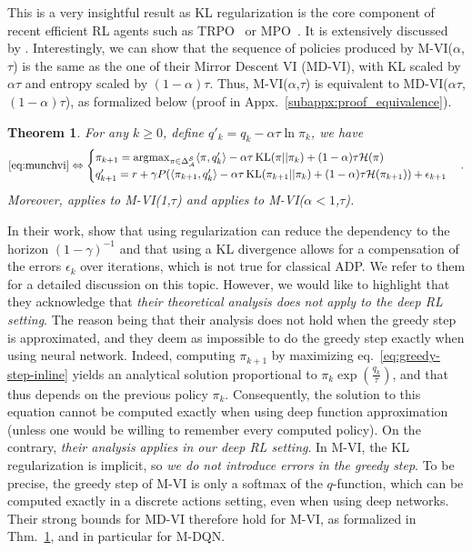 \documentclass{article}
\newtheorem{theorem}{Theorem}
\newcommand{\h}{\mathcal{H}}
\DeclareMathOperator*{\argmax}{argmax}
\DeclareMathOperator{\kl}{KL}
\newcommand{\states}{\mathcal{S}}
\newcommand{\actions}{\mathcal{A}}
\begin{document}
This is a very insightful result as KL regularization is the core component of recent efficient RL agents such as TRPO~\cite{schulman2015trust} or MPO~\cite{abdolmaleki2018maximum}. It is extensively discussed by \citet{vieillard2020leverage}. Interestingly, we can show that the sequence of policies produced by M-VI($\alpha$,$\tau$) is the same as the one of their Mirror Descent VI (MD-VI), with KL scaled by $\alpha\tau$ and entropy scaled by $(1-\alpha)\tau$. Thus, M-VI($\alpha$,$\tau$) is equivalent to MD-VI($\alpha\tau$, $(1-\alpha)\tau$), as formalized below (proof in Appx.~\ref{subappx:proof_equivalence}).
\begin{theorem}
\label{thm:equivalence}
    For any $k\geq 0$, define $q'_k = q_k - \alpha\tau\ln\pi_k$, we have
    \begin{equation}
        \eqref{eq:munchvi} \Leftrightarrow
        \begin{cases}
            \pi_{k+1} = \argmax_{\pi\in\Delta_\actions^\states} \langle \pi, q'_k \rangle - \alpha\tau \kl(\pi||\pi_k) + (1-\alpha)\tau \h(\pi)
            \\
            q'_{k+1} = r + \gamma P(\langle \pi_{k+1}, q'_k\rangle - \alpha\tau \kl(\pi_{k+1}||\pi_k) + (1-\alpha)\tau \h(\pi_{k+1})) + \epsilon_{k+1}
        \end{cases}.
    \end{equation}
    Moreover, \cite[Thm.~1]{vieillard2020leverage} applies to M-VI(1,$\tau$) and \cite[Thm.~2]{vieillard2020leverage} applies to M-VI($\alpha<1$,$\tau$).\end{theorem}

In their work, \citet{vieillard2020leverage} show that using regularization can reduce the dependency to the horizon $(1-\gamma)^{-1}$ and that using a KL divergence allows for a compensation of the errors $\epsilon_k$ over iterations, which is not true for classical ADP. We refer to them for a detailed discussion on this topic. However, we would like to highlight that they acknowledge that \emph{their theoretical analysis does not apply to the deep RL setting}. The reason being that their analysis does not hold when the greedy step is approximated, and they deem as impossible to do the greedy step exactly when using neural network.
Indeed, computing $\pi_{k+1}$ by maximizing eq.~\eqref{eq:greedy-step-inline} yields an analytical solution proportional to $\pi_k \exp(\frac{q_k}{\tau})$, and that thus depends on the previous policy $\pi_k$. Consequently, the solution to this equation cannot be computed exactly when using deep function approximation (unless one would be willing to remember every computed policy). On the contrary, 
\emph{their analysis applies in our deep RL setting}. In M-VI, the KL regularization is implicit, so \emph{we do not introduce errors in the greedy step}. To be precise, the greedy step of M-VI is only a softmax of the $q$-function, which can be computed exactly in a discrete actions setting, even when using deep networks. Their strong bounds for MD-VI therefore hold for M-VI, as formalized in Thm.~\ref{thm:equivalence}, and in particular for M-DQN.
\end{document}
